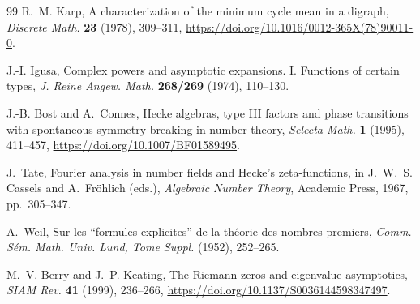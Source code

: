 \documentclass[11pt]{article}
\theoremstyle{definition}
\theoremstyle{plain}
\theoremstyle{remark}
\begin{document}
\begin{thebibliography}{99}
R.~M. Karp,
A characterization of the minimum cycle mean in a digraph,
\emph{Discrete Math.} \textbf{23} (1978), 309--311,
\url{https://doi.org/10.1016/0012-365X(78)90011-0}.

J.-I. Igusa,
Complex powers and asymptotic expansions. I. Functions of certain types,
\emph{J. Reine Angew. Math.} \textbf{268/269} (1974), 110--130.

J.-B. Bost and A.~Connes,
Hecke algebras, type III factors and phase transitions with spontaneous
symmetry breaking in number theory,
\emph{Selecta Math.} \textbf{1} (1995), 411--457,
\url{https://doi.org/10.1007/BF01589495}.

J.~Tate,
Fourier analysis in number fields and Hecke's zeta-functions,
in J.~W.~S. Cassels and A.~Fr\"ohlich (eds.),
\emph{Algebraic Number Theory}, Academic Press, 1967, pp.~305--347.

A.~Weil,
Sur les ``formules explicites'' de la th\'eorie des nombres premiers,
\emph{Comm. S\'em. Math. Univ. Lund, Tome Suppl.} (1952), 252--265.

M.~V. Berry and J.~P. Keating,
The Riemann zeros and eigenvalue asymptotics,
\emph{SIAM Rev.} \textbf{41} (1999), 236--266,
\url{https://doi.org/10.1137/S0036144598347497}.

\end{thebibliography}
\endgroup
\end{document}
